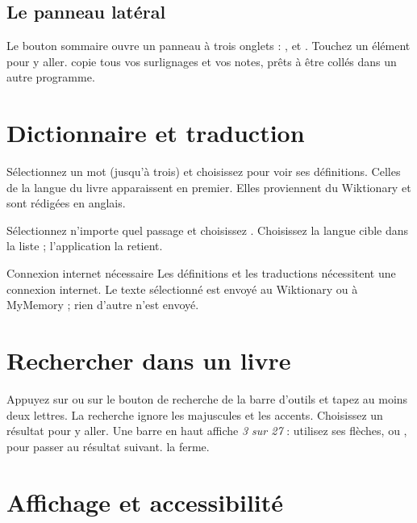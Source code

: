 \documentclass[11pt]{article}
\begin{document}
\subsection{Le panneau latéral}
Le bouton sommaire ouvre un panneau à trois onglets : ,  et .
Touchez un élément pour y aller.  copie tous vos surlignages et vos
notes, prêts à être collés dans un autre programme.

\section{Dictionnaire et traduction}\label{sec:lookup}

Sélectionnez un mot (jusqu’à trois) et choisissez  pour voir ses définitions. Celles
de la langue du livre apparaissent en premier. Elles proviennent du Wiktionary et sont rédigées en
anglais.

Sélectionnez n’importe quel passage et choisissez . Choisissez la langue cible dans la
liste ; l’application la retient.

\begin{note}{Connexion internet nécessaire}
Les définitions et les traductions nécessitent une connexion internet. Le texte sélectionné est
envoyé au Wiktionary ou à MyMemory ; rien d’autre n’est envoyé.
\end{note}

\section{Rechercher dans un livre}\label{sec:search}

Appuyez sur  ou sur le bouton de recherche de la barre d’outils et tapez au moins deux
lettres. La recherche ignore les majuscules et les accents. Choisissez un résultat pour y aller.
Une barre en haut affiche \emph{3 sur 27} : utilisez ses flèches, ou , pour passer au
résultat suivant.  la ferme.

\section{Affichage et accessibilité}\label{sec:display}
\end{document}

